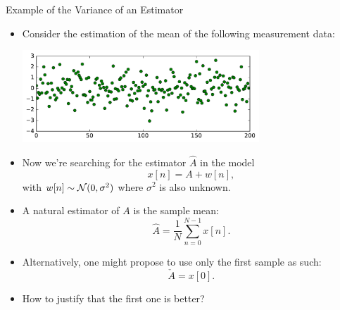 \documentclass[10pt, aspectratio=169]{beamer} %
\begin{document}
\begin{frame}[allowframebreaks=0.8]
{Example of the Variance of an Estimator}
\begin{itemize}
\item Consider the estimation of the mean of the following measurement data:
\centerline{\includegraphics[width=0.7\textwidth]{GaussianRV.pdf}}
\item Now we're searching for the estimator $\hat{A}$ in the model
\[
x[n] = A + w[n],
\]
with $w[n]\sim {\cal N}(0,\sigma^2)$ where $\sigma^2$ is also unknown.
\item A natural estimator of $A$ is the sample mean:
\[
\hat{A} = \frac1N\sum_{n=0}^{N-1}x[n].
\]
\item Alternatively, one might propose to use only the first sample
as such:
\[
\check{A} = x[0].
\]
\item How to justify that the first one is better?
\end{itemize}
\end{frame}
\end{document}
